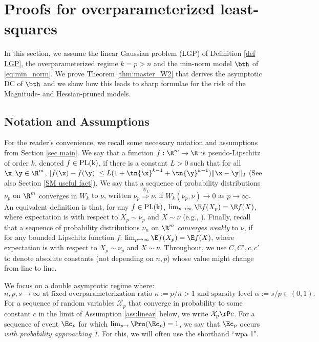 
\section{Proofs for overparameterized least-squares}\label{sec proof thm 1}
In this section, we assume the linear Gaussian problem (LGP) of Definition \ref{def LGP}, the overparameterized regime $k=p>n$ and the min-norm model $\bth$ of \eqref{eq:min_norm}. We prove Theorem \ref{thm:master_W2} that derives the asymptotic DC of $\bth$ and we show how this leads to sharp formulae for the risk of the Magnitude- and Hessian-pruned models.


\subsection{Notation and Assumptions}\label{sec:ass_app}
For the reader's convenience, we recall some necessary notation and assumptions from Section \ref{sec main}.  We say that a function $f:\R^m\rightarrow\R$ is pseudo-Lipschitz of order $k$, denoted $f\in\rm{PL}(k)$, if there is a constant $L>0$ such that for all $\x,\y\in\R^m$,
$
|f(\x) - f(\y)|\leq L(1+\tn{\x}^{k-1}+\tn{\y}^{k-1})\|\x-\y\|_2 
$
(See also Section \ref{SM useful fact}). 
We say that a sequence of probability distributions $\nu_p$ on $\R^m$ {converges in $W_k$} to 
$\nu$, written $\nu_p\stackrel{W_k}{\Longrightarrow} \nu$, if $W_k(\nu_p,\nu) \rightarrow 0$ as $p \rightarrow \infty$. An equivalent definition is that, for any $f\in\rm{PL}(k)$, $\lim_{p\rightarrow\infty}\E f(X_p)=\E f(X)$, where expectation is with respect to $X_p\sim\nu_p$ and $X\sim\nu$ (e.g., \cite{montanari2017estimation}).  
%
Finally, recall that a sequence of probability distributions $\nu_n$ on $\R^m$ \emph{converges weakly} to $\nu$, if for any bounded Lipschitz function $f$: $\lim_{p\rightarrow\infty}\E f(X_p)=\E f(X)$, where expectation is with respect to $X_p\sim\nu_p$ and $X\sim\nu$.
%
Throughout, we use $C,C',c,c'$ to denote absolute constants (not depending on $n,p$) whose value might change from line to line. 


We focus on a double asymptotic regime where:
$$n,p,s\rightarrow\infty \text{ at fixed overparameterization ratio } \kappa:=p/n>1 \text{ and sparsity level } \alpha:=s/p\in(0,1).$$  
%
For a sequence of random variables $\mathcal{X}_{p}$ that converge in probability to some constant $c$ in the limit of Assumption \ref{ass:linear} below, we  write $\mathcal{X}_{p}\rP c$. For a sequence of event $\Ec_p$ for which $\lim_{p\rightarrow}\Pro(\Ec_p) = 1$, we say that $\Ec_p$ occurs \emph{with probability approaching 1}. For this, we will often use the shorthand ``wpa 1". 

